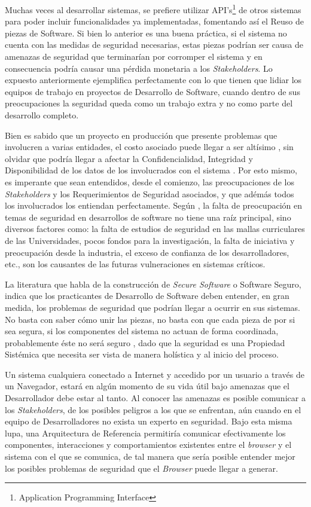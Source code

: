 Muchas veces al desarrollar sistemas, se prefiere utilizar API's\footnote{Application Programming Interface} de otros sistemas para poder incluir funcionalidades ya implementadas, fomentando así el Reuso de piezas de Software. Si bien lo anterior es una buena práctica, si el sistema no cuenta con las medidas de seguridad necesarias, estas piezas podrían ser causa de amenazas de seguridad que terminarían por corromper el sistema y en consecuencia podría causar una pérdida monetaria a los \textit{Stakeholders}. Lo expuesto anteriormente ejemplifica perfectamente con lo que tienen que lidiar los equipos de trabajo en proyectos de Desarrollo de Software, cuando dentro de sus preocupaciones la seguridad queda como un trabajo extra y no como parte del desarrollo completo. 

Bien es sabido que un proyecto en producción que presente problemas que involucren a varias entidades, el costo asociado puede llegar a ser altísimo \cite{cert}, sin olvidar que podría llegar a afectar la Confidencialidad, Integridad y Disponibilidad de los datos de los involucrados con el sistema  \cite{interCoursera}. Por esto mismo, es imperante que sean entendidos, desde el comienzo, las preocupaciones de los \textit{Stakeholders} y los Requerimientos de Seguridad asociados, y que adémás todos los involucrados los entiendan perfectamente. Según \cite{WhyteHarrison}, la falta de preocupación en temas de seguridad en desarrollos de software no tiene una raíz principal, sino diversos factores como: la falta de estudios de seguridad en las mallas curriculares de las Universidades, pocos fondos para la investigación, la falta de iniciativa y preocupación desde la industria, el exceso de confianza de los desarrolladores, etc., son los causantes de las futuras vulneraciones en sistemas críticos. 

La literatura que habla de la construcción de \textit{Secure Software} o Software Seguro, indica que los practicantes de Desarrollo de Software deben entender, en gran medida, los problemas de seguridad que podrían llegar a ocurrir en sus sistemas. No basta con saber cómo unir las piezas, no basta con que cada pieza de por si sea segura, si los componentes del sistema no actuan de forma coordinada, probablemente éste no será seguro \cite{fernandez2013security}, dado que la seguridad es una Propiedad Sistémica que necesita ser vista de manera holística y al inicio del proceso.

Un sistema cualquiera conectado a Internet y accedido por un usuario a través de un Navegador, estará en algún momento de su vida útil bajo amenazas que el Desarrollador debe estar al tanto. Al conocer las amenazas es posible comunicar a los \textit{Stakeholders}, de los posibles peligros a los que se enfrentan, aún cuando en el equipo de Desarrolladores no exista un experto en seguridad. Bajo esta misma lupa, una Arquitectura de Referencia permitiría comunicar efectivamente los componentes, interacciones y comportamientos existentes entre el \textit{browser} y el sistema con el que se comunica, de tal manera que sería posible entender mejor los posibles problemas de seguridad que el \textit{Browser} puede llegar a generar. 


